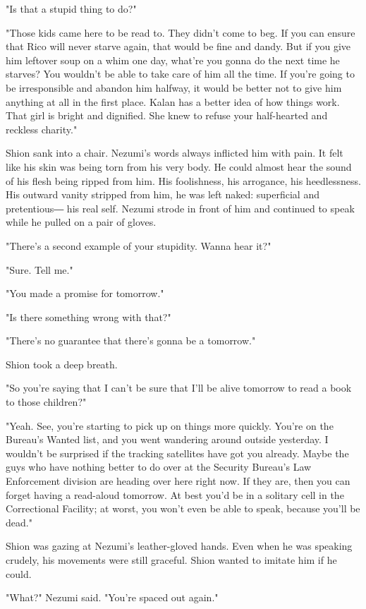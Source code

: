 "Is that a stupid thing to do?"

"Those kids came here to be read to. They didn't come to beg. If you can
ensure that Rico will never starve again, that would be fine and dandy.
But if you give him leftover soup on a whim one day, what're you gonna
do the next time he starves? You wouldn't be able to take care of him
all the time. If you're going to be irresponsible and abandon him
halfway, it would be better not to give him anything at all in the first
place. Kalan has a better idea of how things work. That girl is bright
and dignified. She knew to refuse your half-hearted and reckless
charity."

Shion sank into a chair. Nezumi's words always inflicted him with pain.
It felt like his skin was being torn from his very body. He could almost
hear the sound of his flesh being ripped from him. His foolishness, his
arrogance, his heedlessness. His outward vanity stripped from him, he
was left naked: superficial and pretentious― his real self. Nezumi
strode in front of him and continued to speak while he pulled on a pair
of gloves.

"There's a second example of your stupidity. Wanna hear it?"

"Sure. Tell me."

"You made a promise for tomorrow."

"Is there something wrong with that?"

"There's no guarantee that there's gonna be a tomorrow."

Shion took a deep breath.

"So you're saying that I can't be sure that I'll be alive tomorrow to
read a book to those children?"

"Yeah. See, you're starting to pick up on things more quickly. You're on
the Bureau's Wanted list, and you went wandering around outside
yesterday. I wouldn't be surprised if the tracking satellites have got
you already. Maybe the guys who have nothing better to do over at the
Security Bureau's Law Enforcement division are heading over here right
now. If they are, then you can forget having a read-aloud tomorrow. At
best you'd be in a solitary cell in the Correctional Facility; at worst,
you won't even be able to speak, because you'll be dead."

Shion was gazing at Nezumi's leather-gloved hands. Even when he was
speaking crudely, his movements were still graceful. Shion wanted to
imitate him if he could.

"What?" Nezumi said. "You're spaced out again."

